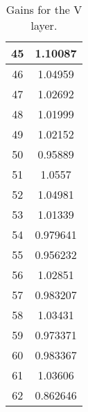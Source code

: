 \begin{table}[h]
\begin{subtable}[h]{2in}
{\begin{tabular}{|c|c|}
45	&	1.10087	\\	\hline
46	&	1.04959	\\	\hline
47	&	1.02692	\\	\hline
48	&	1.01999	\\	\hline
49	&	1.02152	\\	\hline
50	&	0.95889	\\	\hline
51	&	1.0557	\\	\hline
52	&	1.04981	\\	\hline
53	&	1.01339	\\	\hline
54	&	0.979641	\\	\hline
55	&	0.956232	\\	\hline
56	&	1.02851	\\	\hline
57	&	0.983207	\\	\hline
58	&	1.03431	\\	\hline
59	&	0.973371	\\	\hline
60	&	0.983367	\\	\hline
61	&	1.03606	\\	\hline
62	&	0.862646	\\	\hline
        \end{tabular}
        }
        \caption{Gains for the V layer.}
    \end{subtable}
    \quad
    \begin{subtable}[h]{2in}
        \centering{}
\end{subtable}
\end{table}
